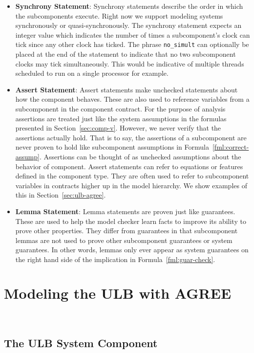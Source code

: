 \documentclass{llncs}
\begin{document}
\begin{itemize}
\item \textbf{Synchrony Statement}: Synchrony statements describe the order in which the subcomponents execute.  Right now we support modeling systems synchronously or quasi-synchronously.  The synchrony statement expects an integer value which indicates the number of times a subcomponent's clock can tick since any other clock has ticked.  The phrase \texttt{no\_simult} can optionally be placed at the end of the statement to indicate that no two subcomponent clocks may tick simultaneously.  This would be indicative of multiple threads scheduled to run on a single processor for example.

\item \textbf{Assert Statement}: Assert statements make unchecked statements about how the component behaves.  These are also used to reference variables from a subcomponent in the component contract.  For the purpose of analysis assertions are treated just like the system assumptions in the formulas presented in Section~\ref{sec:comp-v}.  However, we never verify that the assertions actually hold.  That is to say, the assertions of a subcomponent are never proven to hold like subcomponent assumptions in Formula~\ref{fml:correct-assump}.  Assertions can be thought of as unchecked assumptions about the behavior of component. Assert statements can refer to equations or features defined in the component type. They are often used to refer to subcomponent variables in contracts higher up in the model hierarchy. We show examples of this in Section~\ref{sec:ulb-agree}.

\item \textbf{Lemma Statement}: Lemma statements are proven just like guarantees.  These are used to help the model checker learn facts to improve its ability to prove other properties.  They differ from guarantees in that subcomponent lemmas are not used to prove other subcomponent guarantees or system guarantees.  In other words, lemmas only ever appear as system guarantees on the right hand side of the implication in Formula~\ref{fml:guar-check}.
\end{itemize}

\section{Modeling the ULB with AGREE}~\label{sec:ulb-agree}

\subsection{The ULB System Component}
\end{document}

